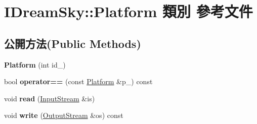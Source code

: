 \hypertarget{class_i_dream_sky_1_1_platform}{}\section{I\+Dream\+Sky\+:\+:Platform 類別 參考文件}
\label{class_i_dream_sky_1_1_platform}
\subsection*{公開方法(Public Methods)}
\begin{DoxyCompactItemize}
\item 
{\bfseries Platform} (int id\+\_)\hypertarget{class_i_dream_sky_1_1_platform_a528f3771f95a56e98db73953df1beb52}{}\label{class_i_dream_sky_1_1_platform_a528f3771f95a56e98db73953df1beb52}

\item 
bool {\bfseries operator==} (const \hyperlink{class_i_dream_sky_1_1_platform}{Platform} \&p\+\_\+) const \hypertarget{class_i_dream_sky_1_1_platform_ade5bbc559264bfc0201994d937c52356}{}\label{class_i_dream_sky_1_1_platform_ade5bbc559264bfc0201994d937c52356}

\item 
void {\bfseries read} (\hyperlink{class_i_dream_sky_1_1_input_stream}{Input\+Stream} \&is)\hypertarget{class_i_dream_sky_1_1_platform_ae9e640d266d2e57e6231e0e324198101}{}\label{class_i_dream_sky_1_1_platform_ae9e640d266d2e57e6231e0e324198101}

\item 
void {\bfseries write} (\hyperlink{class_i_dream_sky_1_1_output_stream}{Output\+Stream} \&os) const \hypertarget{class_i_dream_sky_1_1_platform_a812ad5eb3221e9ff0566b42bc127dcbf}{}\label{class_i_dream_sky_1_1_platform_a812ad5eb3221e9ff0566b42bc127dcbf}

\end{DoxyCompactItemize}

